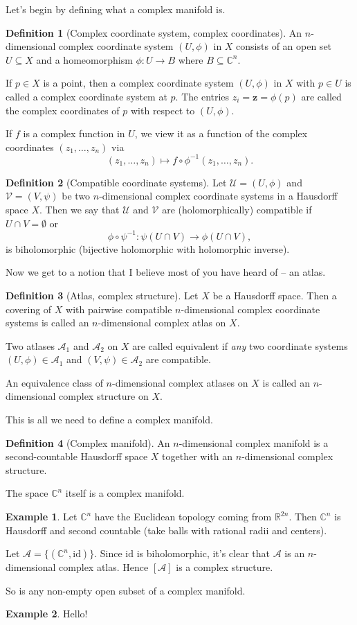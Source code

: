 \documentclass{article}
\theoremstyle{definition}
\newtheorem{exmp}{Example}
\newtheorem{defi}{Definition}
\begin{document}
Let's begin by defining what a complex manifold is.
\begin{defi}[Complex coordinate system, complex coordinates]
  An $n$-dimensional complex coordinate system $(U,\phi)$ in $X$ consists of an open set $U\subseteq X$ and a homeomorphism $\phi:U\to B$ where $B\subseteq\mathbb{C}^n$.

  If $p\in X$ is a point, then a complex coordinate system $(U,\phi)$ in $X$ with $p\in U$ is called a complex coordinate system at $p$. The entries $z_i=\mathbf{z}=\phi(p)$ are called the complex coordinates of $p$ with respect to $(U,\phi)$.

  If $f$ is a complex function in $U$, we view it as a function of the complex coordinates $(z_1,\dots,z_n)$ via
  \[(z_1,\dots,z_n)\mapsto f\circ\phi^{-1}(z_1,\dots,z_n).\]
\end{defi}
\begin{defi}[Compatible coordinate systems]
  Let $\mathcal{U}=(U,\phi)$ and $\mathcal{V}=(V,\psi)$ be two $n$-dimensional complex coordinate systems in a Hausdorff space $X$. Then we say that $\mathcal{U}$ and $\mathcal{V}$ are (holomorphically) compatible if $U\cap V=\emptyset$ or
  \[\phi\circ\psi^{-1}:\psi(U\cap V)\to\phi(U\cap V),\]
  is biholomorphic (bijective holomorphic with holomorphic inverse).
\end{defi}
Now we get to a notion that I believe most of you have heard of -- an atlas.
\begin{defi}[Atlas, complex structure]
  Let $X$ be a Hausdorff space. Then a covering of $X$ with pairwise compatible $n$-dimensional complex coordinate systems is called an $n$-dimensional complex atlas on $X$.

  Two atlases $\mathcal{A}_1$ and $\mathcal{A}_2$ on $X$ are called equivalent if {\it any} two coordinate systems $(U,\phi)\in\mathcal{A}_1$ and $(V,\psi)\in\mathcal{A}_2$ are compatible.

  An equivalence class of $n$-dimensional complex atlases on $X$ is called an $n$-dimensional complex structure on $X$.
\end{defi}
This is all we need to define a complex manifold.
\begin{defi}[Complex manifold]
  An $n$-dimensional complex manifold is a second-countable Hausdorff space $X$ together with an $n$-dimensional complex structure.
\end{defi}
The space $\mathbb{C}^n$ itself is a complex manifold.
\begin{exmp}
  Let $\mathbb{C}^n$ have the Euclidean topology coming from $\mathbb{R}^{2n}$. Then $\mathbb{C}^n$ is Hausdorff and second countable (take balls with rational radii and centers).

  Let $\mathcal{A}=\{(\mathbb{C}^n,\mathrm{id})\}$. Since $\mathrm{id}$ is biholomorphic, it's clear that $\mathcal{A}$ is an $n$-dimensional complex atlas. Hence $[\mathcal{A}]$ is a complex structure.
\end{exmp}
So is any non-empty open subset of a complex manifold.
\begin{exmp}
  Hello!
\end{exmp}
\end{document}

